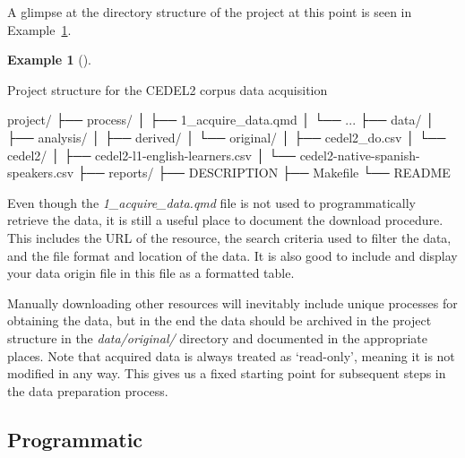 \documentclass[
  letterpaper,
]{latex/krantz}
\newenvironment{Shaded}{\begin{snugshade}}{\end{snugshade}}
\newcommand{\ExtensionTok}[1]{\textcolor[rgb]{0.00,0.00,0.00}{#1}}
\newcommand{\NormalTok}[1]{\textcolor[rgb]{0.00,0.00,0.00}{#1}}
\theoremstyle{definition}
\newtheorem{example}{Example}[chapter]
\theoremstyle{remark}
\begin{document}
A glimpse at the directory structure of the project at this point is
seen in Example~\ref{exm-ad-cedel2-structure}.

\begin{example}[]\protect\hypertarget{exm-ad-cedel2-structure}{}\label{exm-ad-cedel2-structure}

Project structure for the CEDEL2 corpus data acquisition

\begin{Shaded}
\begin{Highlighting}[]
\ExtensionTok{project/}
\ExtensionTok{├──}\NormalTok{ process/}
\ExtensionTok{│}\NormalTok{   ├── 1\_acquire\_data.qmd}
\ExtensionTok{│}\NormalTok{   └── ...}
\ExtensionTok{├──}\NormalTok{ data/}
\ExtensionTok{│}\NormalTok{   ├── analysis/}
\ExtensionTok{│}\NormalTok{   ├── derived/}
\ExtensionTok{│}\NormalTok{   └── original/}
\ExtensionTok{│}\NormalTok{       ├── cedel2\_do.csv}
\ExtensionTok{│}\NormalTok{       └── cedel2/}
\ExtensionTok{│}\NormalTok{           ├── cedel2{-}l1{-}english{-}learners.csv}
\ExtensionTok{│}\NormalTok{           └── cedel2{-}native{-}spanish{-}speakers.csv}
\ExtensionTok{├──}\NormalTok{ reports/}
\ExtensionTok{├──}\NormalTok{ DESCRIPTION}
\ExtensionTok{├──}\NormalTok{ Makefile}
\ExtensionTok{└──}\NormalTok{ README}
\end{Highlighting}
\end{Shaded}

\end{example}

Even though the \emph{1\_acquire\_data.qmd} file is not used to
programmatically retrieve the data, it is still a useful place to
document the download procedure. This includes the URL of the resource,
the search criteria used to filter the data, and the file format and
location of the data. It is also good to include and display your data
origin file in this file as a formatted table.

Manually downloading other resources will inevitably include unique
processes for obtaining the data, but in the end the data should be
archived in the project structure in the \emph{data/original/} directory
and documented in the appropriate places. Note that acquired data is
always treated as `read-only', meaning it is not modified in any way.
This gives us a fixed starting point for subsequent steps in the data
preparation process.

\subsection{Programmatic}\label{programmatic}
\end{document}
